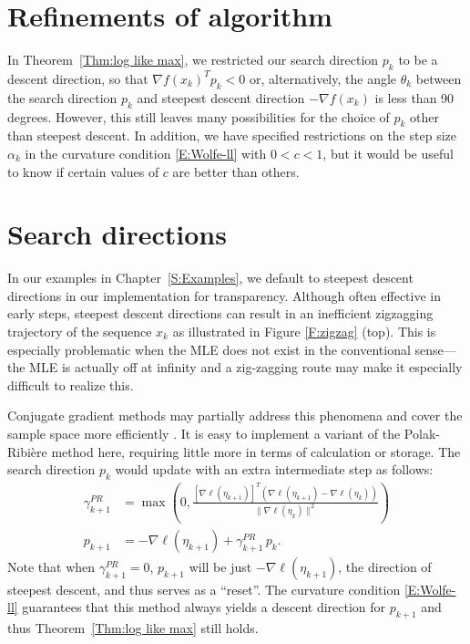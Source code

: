 \section{Refinements of algorithm}

In Theorem~\ref{Thm:log like max}, we restricted our search direction $p_k$ to be a 
descent direction, so that $\nabla f
(x_k)^T p_k < 0$ or, alternatively, the angle $\theta_k$ between the search direction 
$p_k$ and steepest descent 
direction $-\nabla f(x_k)$ is less than 90 degrees.  However, this still leaves many 
possibilities for the choice of 
$p_k$ other than steepest descent.  In addition, we have specified restrictions on the 
step size $\alpha_k$ in the 
curvature condition \eqref{E:Wolfe-ll} with $0 < c < 1$, but it would be useful to 
know if certain values of $c$ are 
better than others.

\section{Search directions} \label{S:Search directions}
In our examples in Chapter~\ref{S:Examples}, we default to steepest descent directions 
in our implementation for 
transparency.  Although often effective in early steps, steepest descent directions 
can result in an inefficient zigzagging 
trajectory of the sequence $x_k$ \citep{Sun:2006}  as 
illustrated in Figure 
\ref{F:zigzag} (top).  This is especially problematic when the MLE does not exist in the 
conventional sense---the MLE is actually off at infinity and a zig-zagging route may 
make it especially difficult to realize this.

Conjugate gradient methods may partially address 
this phenomena and cover the 
sample space more efficiently \citep{NW}.  It is easy to implement a variant of the 
Polak-Ribi\`{e}re method
\citep[pp.~120--122]{NW} here, requiring little more in terms of calculation or 
storage.  The search direction $p_k$ would update 
with an extra intermediate step as follows:
\begin{align*}
	\gamma_{k+1}^{PR} &= \max \left( 0, \frac{ [ \nabla \ell( \eta_{k+1}) ]^T( \nabla \ell( \eta_{k+1} ) - \nabla \ell( \eta_k) )  }
{ \lVert \nabla \ell( \eta_k) \rVert^2 } \right )\\
	p_{k+1} &= -\nabla \ell( \eta_{k+1}) + \gamma_{k+1}^{PR} \, p_k.
\end{align*}
Note that when $\gamma_{k+1}^{PR} = 0$, $p_{k+1}$ will be just $-\nabla \ell( \eta_{k+1})$, 
the direction of steepest 
descent, and thus serves as a ``reset''.  The curvature condition \eqref{E:Wolfe-ll} 
guarantees that this method always 
yields a descent direction for $p_{k+1}$ and thus Theorem~\ref{Thm:log like max} still 
holds.  

